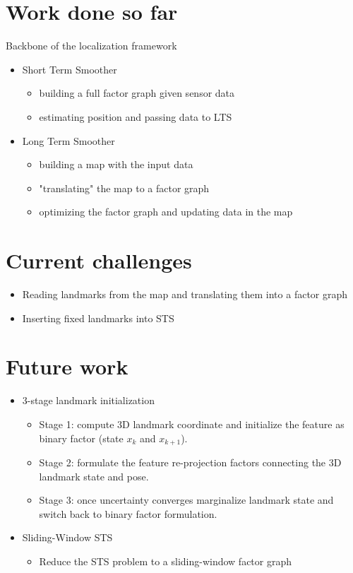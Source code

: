\documentclass[%
    fourtothree=true, %
    DepLogo=true     %
    ]{ETHpres}
\begin{document}
\section*{Work done so far}
Backbone of the localization framework
\begin{itemize}
	\item[\ETHitem] Short Term Smoother 
		\begin{itemize}
			\item building a full factor graph given sensor data
			\item estimating position and passing data to LTS
		\end{itemize}
	\item[\ETHitem] Long Term Smoother
		\begin{itemize}
		 	\item building a map with the input data	
		 	\item "translating" the map to a factor graph
		 	\item optimizing the factor graph and updating data in the map
		\end{itemize}
\end{itemize}

\clearpage

\ETHslide
\section*{Current challenges}
\begin{itemize}
	\item[\ETHitem] Reading landmarks from the map and translating them into a factor graph
	\item[\ETHitem] Inserting fixed landmarks into STS
\end{itemize}
\clearpage

\ETHslide
\section*{Future work}
\begin{itemize}
	\item[\ETHitem] 3-stage landmark initialization
	\begin{itemize}
		\item Stage 1: compute 3D landmark coordinate and initialize the feature as binary factor (state $x_k$ and $x_{k+1}$).
		\item Stage 2: formulate the feature re-projection factors connecting the 3D landmark state and pose.
		\item Stage 3: once uncertainty converges marginalize landmark state and switch back to binary factor formulation.
	\end{itemize}
 	\item[\ETHitem] Sliding-Window STS
	\begin{itemize}
		\item Reduce the STS problem to a sliding-window factor graph		
	\end{itemize} 	
\end{itemize}
\end{document}
